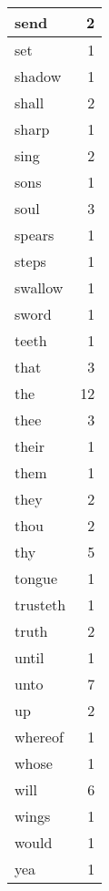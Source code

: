 \begin{center}
\begin{longtable}{l|r}
send & 2 \\ \hline
set & 1 \\ \hline
shadow & 1 \\ \hline
shall & 2 \\ \hline
sharp & 1 \\ \hline
sing & 2 \\ \hline
sons & 1 \\ \hline
soul & 3 \\ \hline
spears & 1 \\ \hline
steps & 1 \\ \hline
swallow & 1 \\ \hline
sword & 1 \\ \hline
teeth & 1 \\ \hline
that & 3 \\ \hline
the & 12 \\ \hline
thee & 3 \\ \hline
their & 1 \\ \hline
them & 1 \\ \hline
they & 2 \\ \hline
thou & 2 \\ \hline
thy & 5 \\ \hline
tongue & 1 \\ \hline
trusteth & 1 \\ \hline
truth & 2 \\ \hline
until & 1 \\ \hline
unto & 7 \\ \hline
up & 2 \\ \hline
whereof & 1 \\ \hline
whose & 1 \\ \hline
will & 6 \\ \hline
wings & 1 \\ \hline
would & 1 \\ \hline
yea & 1 \\ \hline
\end{longtable}
\end{center}



\normalsize



